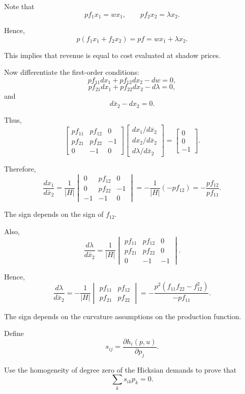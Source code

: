 Note that
\[
pf_1x_1=wx_1,
\qquad
pf_2x_2=\lambda x_2.
\]

Hence,
\[
p(f_1x_1+f_2x_2)
=
pf
=
wx_1+\lambda x_2.
\]

This implies that revenue is equal to cost evaluated at shadow prices.

Now differentiate the first-order conditions:
\[
pf_{11}dx_1+pf_{12}dx_2-dw=0,
\]
\[
pf_{21}dx_1+pf_{22}dx_2-d\lambda=0,
\]
and
\[
d\bar{x}_2-dx_2=0.
\]

Thus,
\[
\begin{bmatrix}
pf_{11} & pf_{12} & 0 \\
pf_{21} & pf_{22} & -1 \\
0 & -1 & 0
\end{bmatrix}
\begin{bmatrix}
dx_1/d\bar{x}_2 \\
dx_2/d\bar{x}_2 \\
d\lambda/d\bar{x}_2
\end{bmatrix}
=
\begin{bmatrix}
0 \\
0 \\
-1
\end{bmatrix}.
\]

Therefore,
\[
\frac{dx_1}{d\bar{x}_2}
=
\frac{1}{|H|}
\begin{vmatrix}
0 & pf_{12} & 0 \\
0 & pf_{22} & -1 \\
-1 & -1 & 0
\end{vmatrix}
=
-\frac{1}{|H|}(-pf_{12})
=
-\frac{pf_{12}}{pf_{11}}.
\]

The sign depends on the sign of \(f_{12}\).

Also,
\[
\frac{d\lambda}{d\bar{x}_2}
=
\frac{1}{|H|}
\begin{vmatrix}
pf_{11} & pf_{12} & 0 \\
pf_{21} & pf_{22} & 0 \\
0 & -1 & -1
\end{vmatrix}.
\]

Hence,
\[
\frac{d\lambda}{d\bar{x}_2}
=
-\frac{1}{|H|}
\begin{vmatrix}
pf_{11} & pf_{12} \\
pf_{21} & pf_{22}
\end{vmatrix}
=
-\frac{
p^2(f_{11}f_{22}-f_{12}^2)
}{
-pf_{11}
}.
\]

The sign depends on the curvature assumptions on the production function.



\begin{exercise}
Define
\[
s_{ij}
=
\frac{\partial h_i(p,u)}{\partial p_j}.
\]

Use the homogeneity of degree zero of the Hicksian demands to prove that
\[
\sum_k s_{ik}p_k=0.
\]
\end{exercise}

